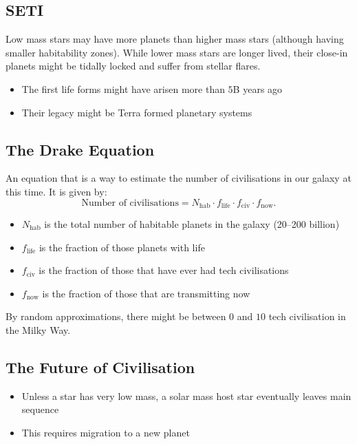 \documentclass[class=article, crop=false]{standalone}
\begin{document}
  \subsection{SETI}
  Low mass stars may have more planets than higher mass stars (although having smaller habitability zones). While lower mass stars are longer lived, their close-in planets might be tidally locked and suffer from stellar flares.
  \begin{itemize}
    \item The first life forms might have arisen more than $5$B years ago
    \item Their legacy might be Terra formed planetary systems
  \end{itemize}
  \subsection{The Drake Equation}
  An equation that is a way to estimate the number of civilisations in our galaxy at this time. It is given by:
  \[
    \text{Number of civilisations} = N_\text{hab}\cdot f_\text{life}\cdot f_\text{civ}\cdot f_\text{now}.
  \]
  \begin{itemize}
    \item $N_\text{hab}$ is the total number of habitable planets in the galaxy (20--200 billion)
    \item $f_\text{life}$ is the fraction of those planets with life
    \item $f_\text{civ}$ is the fraction of those that have ever had tech civilisations
    \item $f_\text{now}$ is the fraction of those that are transmitting now
  \end{itemize}
  By random approximations, there might be between $0$ and $10$ tech civilisation in the Milky Way.
  \subsection{The Future of Civilisation}
  \begin{itemize}
    \item Unless a star has very low mass, a solar mass host star eventually leaves main sequence
    \item This requires migration to a new planet
  \end{itemize}
\end{document}
